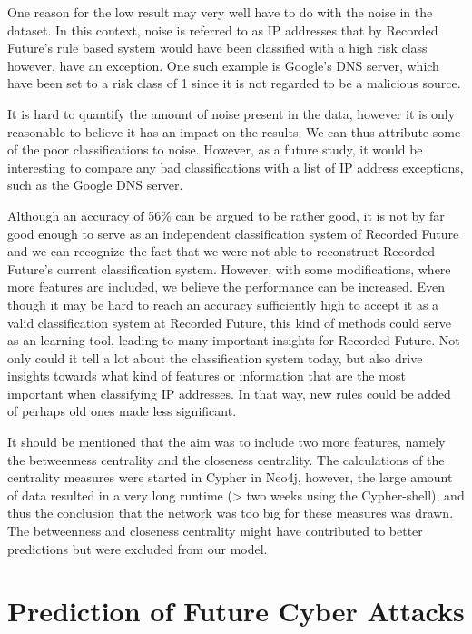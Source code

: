 
One reason for the low result may very well have to do with the noise in the dataset. In this context, noise is referred to as IP addresses that by Recorded Future's rule based system would have been classified with a high risk class however, have an exception. One such example is Google's DNS server, which have been set to a risk class of 1 since it is not regarded to be a malicious source. 

It is hard to quantify the amount of noise present in the data, however it is only reasonable to believe it has an impact on the results. We can thus attribute some of the poor classifications to noise. However, as a future study, it would be interesting to compare any bad classifications with a list of IP address exceptions, such as the Google DNS server. 

Although an accuracy of 56\% can be argued to be rather good, it is not by far good enough to serve as an independent classification system of Recorded Future and we can recognize the fact that we were not able to reconstruct Recorded Future's current classification system. However, with some modifications, where more features are included, we believe the performance can be increased. Even though it may be hard to reach an accuracy sufficiently high to accept it as a valid classification system at Recorded Future, this kind of methods could serve as an learning tool, leading to many important insights for Recorded Future. Not only could it tell a lot about the classification system today, but also drive insights towards what kind of features or information that are the most important when classifying IP addresses. In that way, new rules could be added of perhaps old ones made less significant. 

It should be mentioned that the aim was to include two more features, namely the betweenness centrality and the closeness centrality. The calculations of the centrality measures were started in Cypher in Neo4j, however, the large amount of data resulted in a very long runtime (> two weeks using the Cypher-shell), and thus the conclusion that the network was too big for these measures was drawn. The betweenness and closeness centrality might have contributed to better predictions but were excluded from our model.


\section{Prediction of Future Cyber Attacks}


